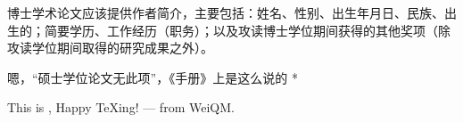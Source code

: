\biography
博士学术论文应该提供作者简介，主要包括：姓名、性别、出生年月日、民族、出生的；简要学历、工作经历（职务）；以及攻读博士学位期间获得的其他奖项（除攻读学位期间取得的研究成果之外）。

\par * 嗯，“硕士学位论文无此项”，《手册》上是这么说的 * \par

\vspace{5cm}

This is \BUAAThesis, Happy TeXing! --- from WeiQM.